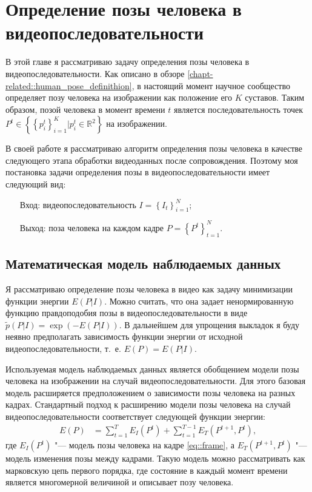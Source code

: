 \chapter{Определение позы человека в видеопоследовательности} \label{chapt6}

В этой главе я рассматриваю задачу определения позы человека в видеопоследовательности. Как описано в обзоре \ref{chapt-related::human_pose_definithion}, в настоящий момент научное сообщество определяет позу человека на изображении как положение его $K$ суставов. Таким образом, позой человека в момент времени $t$ является последовательность точек $P^t \in \left\{ \left\{p_i^t\right\}_{i=1}^K | p_i^t \in \mathbb{R}^2\right\}$ на изображении.

В своей работе я рассматриваю алгоритм определения позы человека в качестве следующего этапа обработки видеоданных после сопровождения. Поэтому моя постановка задачи определения позы в видеопоследовательности имеет следующий вид:
\begin{itemize}
	\item[Вход:] видеопоследовательность $I=\left\{I_t\right\}_{i=1}^N$;
	\item[Выход:] поза человека на каждом кадре $P=\left\{P^t\right\}_{t=1}^{N}$.
\end{itemize}

\section{Математическая модель наблюдаемых данных}

Я рассматриваю определение позы человека в видео как задачу минимизации функции энергии $E(P|I)$. Можно считать, что она задает ненормированную функцию правдоподобия позы в видеопоследовательности в виде $\tilde{p}(P|I) = \exp\left(-E(P|I)\right)$. В дальнейшем для упрощения выкладок я буду неявно предполагать зависимость функции энергии от исходной видеопоследовательности, т.~е. $E(P) = E(P|I)$.

Используемая модель наблюдаемых данных является обобщением модели позы человека на изображении на случай видеопоследовательности. Для этого базовая модель расширяется предположением о зависимости позы человека на разных кадрах. Стандартный подход к расширению модели позы человека на случай видеопоследовательности соответствует следующей функции энергии:
\begin{equation}
	\begin{aligned}
		E(P) &= \sum_{t=1}^T E_I(P^t) + \sum_{t=1}^{T-1}E_T(P^{t+1}, P^{t}),
	\end{aligned}
\end{equation}
где $E_I(P^t)$ "--- модель позы человека на кадре \eqref{eq::frame}, а $E_T(P^{t+1}, P^{t})$ "--- модель изменения позы между кадрами. Такую модель можно рассматривать как марковскую цепь первого порядка, где состояние в каждый момент времени является многомерной величиной и описывает позу человека.

